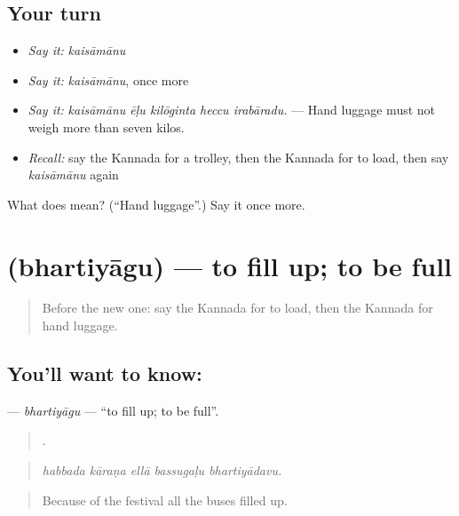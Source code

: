 \subsection*{Your turn}
\begin{itemize}
\raggedright
  \item \emph{Say it:} \emph{kaisāmānu}
  \item \emph{Say it:} \emph{kaisāmānu}, once more
  \item \emph{Say it:} \emph{kaisāmānu ēḷu kilōginta heccu irabāradu.} — Hand luggage must not weigh more than seven kilos.
  \item \emph{Recall:} say the Kannada for a trolley, then the Kannada for to load, then say \emph{kaisāmānu} again
\end{itemize}

\begin{tcolorbox}[breakable,colback=teal!4,colframe=teal!35!black,title={Before you move on}]
What does  mean? (\textquotedblleft{}Hand luggage\textquotedblright{}.) Say it once more.
\end{tcolorbox}
\section[\texorpdfstring{\kn{ಭರ್ತಿಯಾಗು} (bhartiyāgu)}{ಭರ್ತಿಯಾಗು (bhartiyāgu)}]{ (bhartiyāgu) — to fill up; to be full}

\label{lesson:KA-C436-bhartiyagu}



\begin{quote}
Before the new one: say the Kannada for to load, then the Kannada for hand luggage.
\end{quote}

\subsection*{You'll want to know: }
\textbf{} — \emph{bhartiyāgu} — \textquotedblleft{}to fill up; to be full\textquotedblright{}.

\begin{quote}
    .
\end{quote}

\begin{quote}
\emph{habbada kāraṇa ellā bassugaḷu bhartiyādavu.}
\end{quote}

\begin{quote}
Because of the festival all the buses filled up.
\end{quote}

